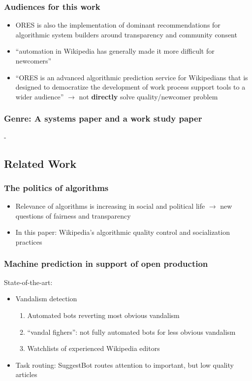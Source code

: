 \documentclass[12pt,a4paper]{article}
\begin{document}
\subsubsection{Audiences for this work}
\begin{itemize}
\item ORES is also the implementation of dominant recommendations for algorithmic system builders around transparency and community consent
\item ``automation in Wikipedia has generally made it more difficult for newcomers''
\item ``ORES is an advanced algorithmic
prediction service for Wikipedians that is designed to democratize the development of work
process support tools to a wider audience'' \(\rightarrow\) not \textbf{directly} solve quality/newcomer problem
\end{itemize}
\subsubsection{Genre: A systems paper and a work study paper}
-
\subsection{Related Work}
\subsubsection{The politics of algorithms}
\begin{itemize}
\item Relevance of algorithms is increasing in social and political life \(\rightarrow\) new questions of fairness and transparency
\item In this paper: Wikipedia's algorithmic quality control and socialization practices
\end{itemize}
\subsubsection{Machine prediction in support of open production}
State-of-the-art:
\begin{itemize}
\item Vandalism detection
\begin{enumerate}
\item Automated bots reverting most obvious vandalism
\item ``vandal fighers'': not fully automated bots for less obvious vandalism
\item Watchlists of experienced Wikipedia editors
\end{enumerate}
\item Task routing: SuggestBot routes attention to important, but low quality articles
\end{itemize}
\end{document}
